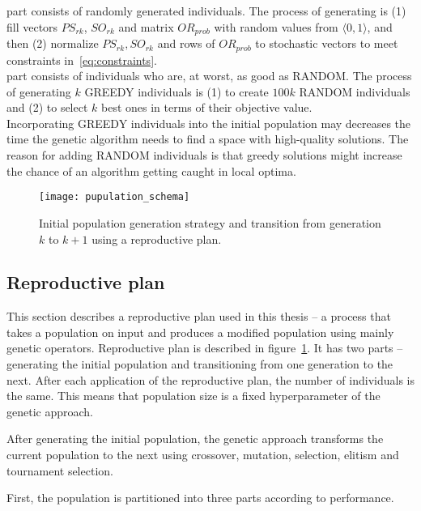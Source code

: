  part consists of randomly generated individuals.
The process of generating is (1) fill vectors $PS_{rk}$, $SO_{rk}$ and matrix $OR_{prob}$ with random values from $\langle 0,1 \rangle$,
and then (2) normalize $PS_{rk}, SO_{rk}$ and rows of $OR_{prob}$  to stochastic vectors to meet constraints in~\ref{eq:constraints}.\\

 part consists of individuals who are, at worst, as good as RANDOM.
The process of generating $k$ GREEDY individuals is (1) to create $100k$ RANDOM individuals and (2) to select $k$ best ones
in terms of their objective value.\\

Incorporating GREEDY individuals into the initial population may decreases the time the genetic algorithm needs to find a space with high-quality solutions.
The reason for adding RANDOM individuals is that greedy solutions might increase the chance
of an algorithm getting caught in local optima.

\begin{figure}[!h]
    \texttt{[image: pupulation\_schema]}
    \caption[Initial population generation strategy and transition]
    {Initial population generation strategy and transition from generation $k$ to $k+1$ using a reproductive plan.}
    \label{fig:population-schema}
\end{figure}


\newpage
\subsection{Reproductive plan}\label{subsec:reproductive-plan}
This section describes a reproductive plan used in this thesis
– a process that takes a population on input and produces a modified population using mainly genetic operators.
Reproductive plan is described in figure~\ref{fig:population-schema}.
It has two parts – generating the initial population and transitioning from one generation to the next.
After each application of the reproductive plan, the number of individuals is the same.
This means that population size is a fixed hyperparameter of the genetic approach.

After generating the initial population, the genetic approach transforms the current population
to the next using crossover, mutation, selection, elitism and tournament selection.

First, the population is partitioned into three parts according to performance.\\


